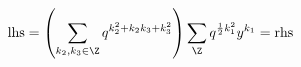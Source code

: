 \begin{equation}
  {\rm lhs} =  \left( \sum_{k_2,k_3\in\Z} q^{k_2^2+k_2 k_3+k_3^2} \right)
  \sum_\Z q^{{1\over 2} k_1^2} y^{k_1}  =   {\rm rhs}
\end{equation}

